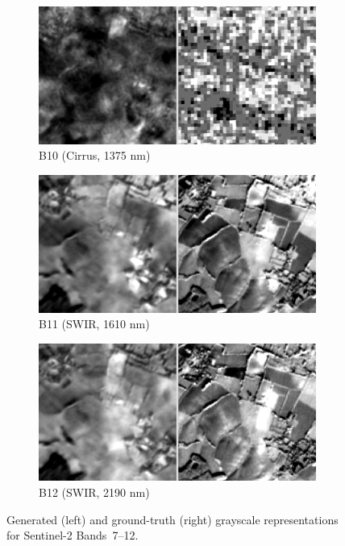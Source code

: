 \begin{figure}[p]
    \vspace{0.5em}
    \begin{subfigure}{0.48\textwidth}
        \centering
        \includegraphics[width=\linewidth]{img/bands_gray/sample_000008_B11_panel.png}
        \caption{B10 (Cirrus, 1375 nm)}
    \end{subfigure}\hfill
    \begin{subfigure}{0.48\textwidth}
        \centering
        \includegraphics[width=\linewidth]{img/bands_gray/sample_000008_B12_panel.png}
        \caption{B11 (SWIR, 1610 nm)}
    \end{subfigure}

    \vspace{0.5em}
    \begin{subfigure}{0.48\textwidth}
        \centering
        \includegraphics[width=\linewidth]{img/bands_gray/sample_000008_B13_panel.png}
        \caption{B12 (SWIR, 2190 nm)}
    \end{subfigure}

    \caption[Bandwise grayscale reconstructions (Bands 7–12)]%
    {Generated (left) and ground-truth (right) grayscale representations for Sentinel-2 Bands~7–12.}
\end{figure}


